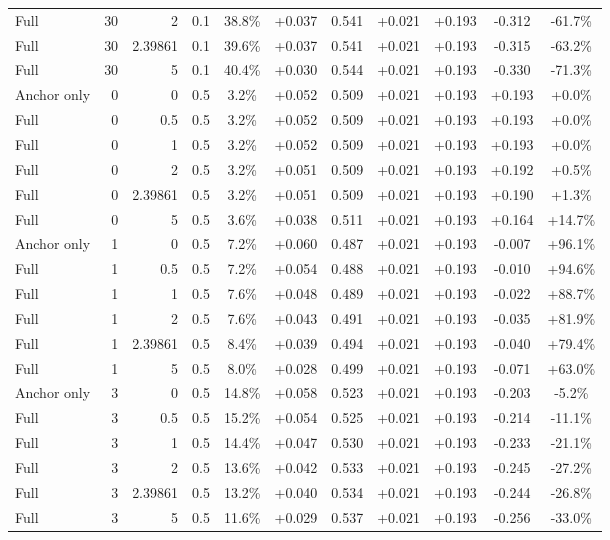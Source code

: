 \begin{table}[htbp]
\begin{tabular}{lrrrccccccc}
Full & 30 & 2 & 0.1 & 38.8\% & +0.037 & 0.541 & +0.021 & +0.193 & -0.312 & -61.7\% \\
Full & 30 & 2.39861 & 0.1 & 39.6\% & +0.037 & 0.541 & +0.021 & +0.193 & -0.315 & -63.2\% \\
Full & 30 & 5 & 0.1 & 40.4\% & +0.030 & 0.544 & +0.021 & +0.193 & -0.330 & -71.3\% \\
Anchor only & 0 & 0 & 0.5 & 3.2\% & +0.052 & 0.509 & +0.021 & +0.193 & +0.193 & +0.0\% \\
Full & 0 & 0.5 & 0.5 & 3.2\% & +0.052 & 0.509 & +0.021 & +0.193 & +0.193 & +0.0\% \\
Full & 0 & 1 & 0.5 & 3.2\% & +0.052 & 0.509 & +0.021 & +0.193 & +0.193 & +0.0\% \\
Full & 0 & 2 & 0.5 & 3.2\% & +0.051 & 0.509 & +0.021 & +0.193 & +0.192 & +0.5\% \\
Full & 0 & 2.39861 & 0.5 & 3.2\% & +0.051 & 0.509 & +0.021 & +0.193 & +0.190 & +1.3\% \\
Full & 0 & 5 & 0.5 & 3.6\% & +0.038 & 0.511 & +0.021 & +0.193 & +0.164 & +14.7\% \\
Anchor only & 1 & 0 & 0.5 & 7.2\% & +0.060 & 0.487 & +0.021 & +0.193 & -0.007 & +96.1\% \\
Full & 1 & 0.5 & 0.5 & 7.2\% & +0.054 & 0.488 & +0.021 & +0.193 & -0.010 & +94.6\% \\
Full & 1 & 1 & 0.5 & 7.6\% & +0.048 & 0.489 & +0.021 & +0.193 & -0.022 & +88.7\% \\
Full & 1 & 2 & 0.5 & 7.6\% & +0.043 & 0.491 & +0.021 & +0.193 & -0.035 & +81.9\% \\
Full & 1 & 2.39861 & 0.5 & 8.4\% & +0.039 & 0.494 & +0.021 & +0.193 & -0.040 & +79.4\% \\
Full & 1 & 5 & 0.5 & 8.0\% & +0.028 & 0.499 & +0.021 & +0.193 & -0.071 & +63.0\% \\
Anchor only & 3 & 0 & 0.5 & 14.8\% & +0.058 & 0.523 & +0.021 & +0.193 & -0.203 & -5.2\% \\
Full & 3 & 0.5 & 0.5 & 15.2\% & +0.054 & 0.525 & +0.021 & +0.193 & -0.214 & -11.1\% \\
Full & 3 & 1 & 0.5 & 14.4\% & +0.047 & 0.530 & +0.021 & +0.193 & -0.233 & -21.1\% \\
Full & 3 & 2 & 0.5 & 13.6\% & +0.042 & 0.533 & +0.021 & +0.193 & -0.245 & -27.2\% \\
Full & 3 & 2.39861 & 0.5 & 13.2\% & +0.040 & 0.534 & +0.021 & +0.193 & -0.244 & -26.8\% \\
Full & 3 & 5 & 0.5 & 11.6\% & +0.029 & 0.537 & +0.021 & +0.193 & -0.256 & -33.0\% \\

\end{tabular}
\end{table}
